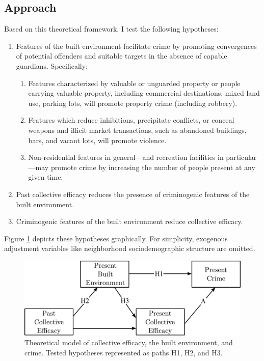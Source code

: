 \documentclass [11pt, proquest] {uwthesis}[2015/03/03]
\providecommand{\tightlist}{%
  \setlength{\itemsep}{0pt}\setlength{\parskip}{0pt}}
\begin{document}
\hypertarget{approach}{%
\subsection{Approach}\label{approach}}

Based on this theoretical framework, I test the following hypotheses:
\begin{enumerate}
\def\labelenumi{\arabic{enumi}.}
\tightlist
\item
  Features of the built environment facilitate crime by promoting convergences of potential offenders and suitable targets in the absence of capable guardians. Specifically:
  \begin{enumerate}
  \def\labelenumii{\alph{enumii}.}
  \tightlist
  \item
    Features characterized by valuable or unguarded property or people carrying valuable property, including commercial destinations, mixed land use, parking lots, will promote property crime (including robbery).
  \item
    Features which reduce inhibitions, precipitate conflicts, or conceal weapons and illicit market transactions, such as abandoned buildings, bars, and vacant lots, will promote violence.
  \item
    Non-residential features in general---and recreation facilities in particular---may promote crime by increasing the number of people present at any given time.
  \end{enumerate}
\item
  Past collective efficacy reduces the presence of criminogenic features of the built environment.
\item
  Criminogenic features of the built environment reduce collective efficacy.
\end{enumerate}
Figure \ref{fig:basicmodel} depicts these hypotheses graphically. For simplicity, exogenous adjustment variables like neighborhood sociodemographic structure are omitted.
\begin{figure}
\includegraphics[width=1\linewidth]{./figure/ch2/basic_model} \caption{Theoretical model of collective efficacy, the built environment, and crime. Tested hypotheses represented as paths H1, H2, and H3.}\label{fig:basicmodel}
\end{figure}
\end{document}
